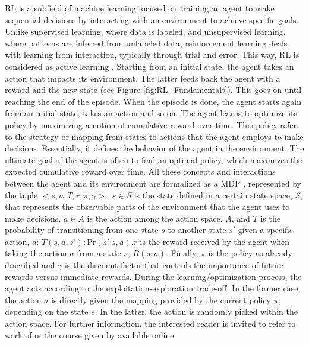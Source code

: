 \Gls{RL} is a subfield of machine learning focused on training an agent to make sequential decisions by interacting with an environment to achieve specific goals. Unlike supervised learning, where data is labeled, and unsupervised learning, where patterns are inferred from unlabeled data, reinforcement learning deals with learning from interaction, typically through trial and error. This way, \gls{RL} is considered as active learning \cite{cao2020reinforcement}. Starting from an initial state, the agent takes an action that impacts its environment. The latter feeds back the agent with a reward and the new state (see Figure \ref{fig:RL_Fundamentals}). This goes on until reaching the end of the episode. When the episode is done, the agent starts again from an initial state, takes an action and so on. The agent learns to optimize its policy by maximizing a notion of cumulative reward over time. This policy refers to the strategy or mapping from states to actions that the agent employs to make decisions. Essentially, it defines the behavior of the agent in the environment. The ultimate goal of the agent is often to find an optimal policy, which maximizes the expected cumulative reward over time.  All these concepts and interactions between the agent and its environment are formalized as a \gls{MDP} \cite{sutton2018reinforcement}, represented by the tuple $<s,a,T,r,\pi,\gamma>$. $s\in S$ is the state defined in a certain state space, $S$, that represents the observable parts of the environment that the agent uses to make decisions.  $a\in A$ is the action among the action space, $A$, and $T$ is the probability of transitioning from one state $s$ to another state $s'$ given a specific action, $a$: $T(s,a,s'): \text{Pr}\left(s'|s,a\right)$.$r$ is the reward received by the agent when taking the action $a$ from a state $s$, $R(s,a)$. Finally, $\pi$ is the policy as already described and $\gamma$ is the discount factor that controls the importance of future rewards versus immediate rewards. During the learning/optimization process, the agent acts according to the exploitation-exploration trade-off. In the former case, the action $a$ is directly given the mapping provided by the current policy $\pi$,  depending on the state $s$. In the latter, the action is randomly picked within the action space. For further information, the interested reader is invited to refer to work of \citet{sutton2018reinforcement} or the course given by \citet{davidsilver_RL_online} available online.

